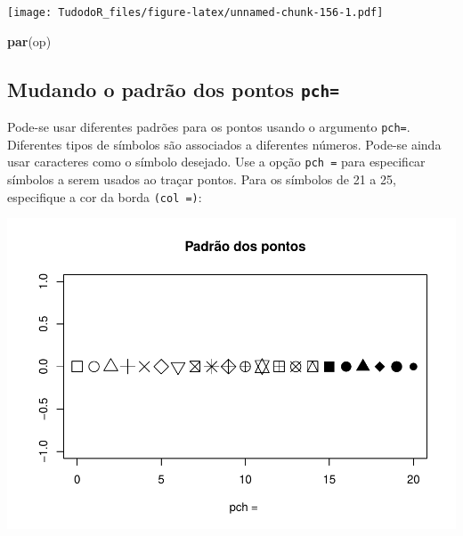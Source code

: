 \documentclass[
]{book}
\newenvironment{Shaded}{\begin{snugshade}}{\end{snugshade}}
\newcommand{\DataTypeTok}[1]{\textcolor[rgb]{0.13,0.29,0.53}{#1}}
\newcommand{\DecValTok}[1]{\textcolor[rgb]{0.00,0.00,0.81}{#1}}
\newcommand{\FloatTok}[1]{\textcolor[rgb]{0.00,0.00,0.81}{#1}}
\newcommand{\KeywordTok}[1]{\textcolor[rgb]{0.13,0.29,0.53}{\textbf{#1}}}
\newcommand{\NormalTok}[1]{#1}
\newcommand{\OperatorTok}[1]{\textcolor[rgb]{0.81,0.36,0.00}{\textbf{#1}}}
\begin{document}
\texttt{[image: TudodoR\_files/figure-latex/unnamed-chunk-156-1.pdf]}

\begin{Shaded}
\begin{Highlighting}[]
\KeywordTok{par}\NormalTok{(op)}
\end{Highlighting}
\end{Shaded}

\hypertarget{mudando-o-padruxe3o-dos-pontos-pch}{%
\subsection{\texorpdfstring{Mudando o padrão dos pontos \texttt{pch=}}{Mudando o padrão dos pontos pch=}}\label{mudando-o-padruxe3o-dos-pontos-pch}}

Pode-se usar diferentes padrões para os pontos usando o argumento \texttt{pch=}. Diferentes tipos de símbolos são associados a diferentes números. Pode-se ainda usar caracteres como o símbolo desejado.
Use a opção \texttt{pch\ =} para especificar símbolos a serem usados ao traçar pontos. Para os símbolos de 21 a 25, especifique a cor da borda \texttt{(col\ =)}:

\begin{Shaded}
\end{Shaded}

\includegraphics{TudodoR_files/figure-latex/unnamed-chunk-157-1.pdf}
\end{document}
